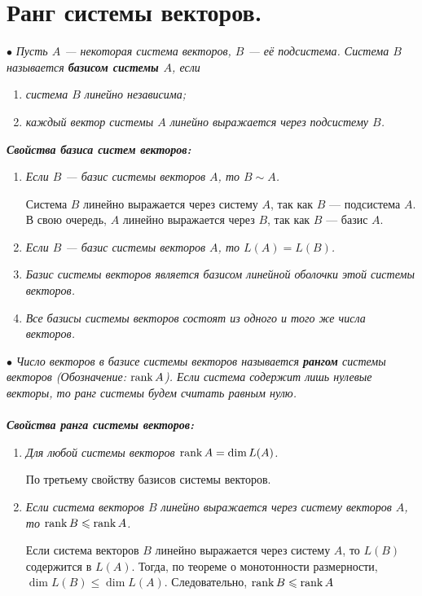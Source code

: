\section{Ранг системы векторов.}
$\bullet$ \textit{ Пусть $A$ --- некоторая система векторов, $B$ --- её подсистема. Система $B$ называется \textbf{базисом системы $A$}, если}\begin{enumerate}
	\item \textit{система $B$ линейно независима;}
	\item \textit{каждый вектор системы $A$ линейно выражается через подсистему $B$.}
\end{enumerate}
\textit{\textbf{Свойства базиса систем векторов:}}\begin{enumerate}
	\item \textit{Если $B$ --- базис системы векторов $A$, то $B\sim A$.}\begin{Proof}
		Система $B$ линейно выражается через систему $A$, так как $B$ --- подсистема $A$. В свою очередь, $A$ линейно выражается через $B$, так как $B$ --- базис $A$.
	\end{Proof}
	\item \textit{Если $B$  --- базис системы векторов $A$, то $L(A) = L(B)$.}
	\item \textit{Базис системы векторов является базисом линейной оболочки этой системы векторов.}
	\item \textit{Все базисы системы векторов состоят из одного и того же числа векторов.}
\end{enumerate}
$\bullet$ \textit{Число векторов в базисе системы векторов называется \textbf{рангом} системы векторов (Обозначение: $\operatorname{rank} A$). Если система содержит лишь нулевые векторы, то ранг системы будем считать равным нулю.}\\\\
\textbf{\textit{Свойства ранга системы векторов:}}\begin{enumerate}
	\item \textit{Для любой системы векторов $\operatorname{rank} A = \dim  L(A)$.}
	\begin{Proof}
		По третьему свойству базисов системы векторов.
	\end{Proof}
	\item \textit{Если система векторов $B$ линейно выражается через систему векторов $A$, то $\operatorname{rank} B\leqslant \operatorname{rank} A$.}\begin{Proof}
		Если система векторов $B$ линейно выражается через систему $A$, то $L(B)$ содержится в $L(A)$. Тогда, по теореме о монотонности размерности, $\dim L(B)\leqslant \dim L(A)$. Следовательно, $\operatorname{rank} B\leqslant \operatorname{rank} A$
	\end{Proof}
\end{enumerate}
